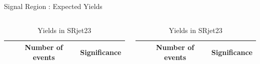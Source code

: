 \documentclass[mathserif,serif]{beamer}
\begin{document}
\begin{frame}{Signal Region : Expected Yields}
\begin{table}[htbp]
\centering
\tiny

\begin{columns}

\begin{column}{0.5\textwidth}
\begin{tabular}{|c|c|c|}
\hline
& Number of events & Significance \\
\hline

\end{tabular}
\caption{\tiny Yields in SRjet1}
\end{column}

\begin{column}{0.5\textwidth}
\begin{tabular}{|c|c|c|}
\hline
& Number of events & Significance \\
\hline

\end{tabular}
\caption{\tiny Yields in SRjet23}
\end{column}

\end{columns}
\end{table}
\end{frame}
\end{document}
